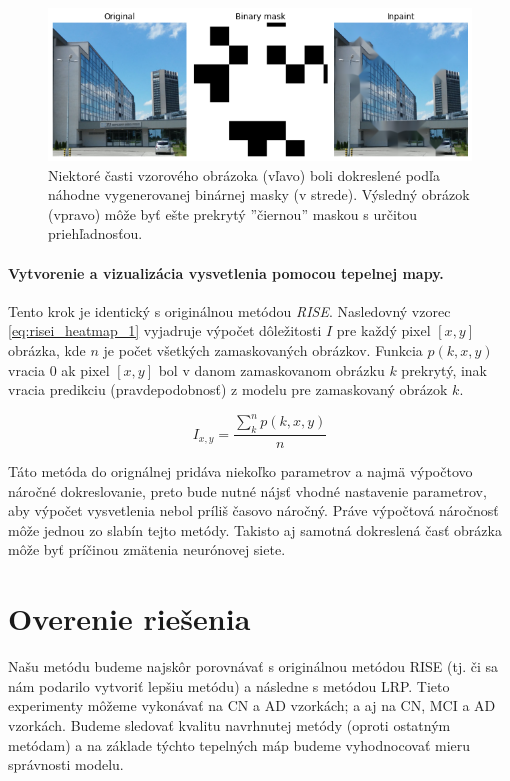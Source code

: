 \begin{figure}[h!]
    \centering
    \includegraphics[width=13cm]{assets/images/risei_inpainting_example.png}
    \caption{Niektoré časti vzorového obrázoka (vľavo) boli dokreslené podľa náhodne vygenerovanej binárnej masky (v strede). Výsledný obrázok (vpravo) môže byť ešte prekrytý ''čiernou'' maskou s určitou priehľadnosťou.}
    \label{fig:risei_inpainting_example}
\end{figure}

\paragraph{Vytvorenie a vizualizácia vysvetlenia pomocou tepelnej mapy.}

Tento krok je identický s originálnou metódou \textit{RISE}. Nasledovný vzorec \ref{eq:risei_heatmap_1} vyjadruje výpočet dôležitosti $I$ pre každý pixel $[x, y]$ obrázka, kde $n$ je počet všetkých zamaskovaných obrázkov. Funkcia $p(k, x, y)$ vracia $0$ ak pixel $[x, y]$ bol v danom zamaskovanom obrázku $k$ prekrytý, inak vracia predikciu (pravdepodobnosť) z modelu pre zamaskovaný obrázok $k$.

\begin{equation}
    I_{x, y} = \frac{\sum_{k}^{n} p(k, x, y)}{n}
    \label{eq:risei_heatmap_1}
\end{equation}

Táto metóda do orignálnej pridáva niekoľko parametrov a najmä výpočtovo náročné dokreslovanie, preto bude nutné nájsť vhodné nastavenie parametrov, aby výpočet vysvetlenia nebol príliš časovo náročný. Práve výpočtová náročnosť môže jednou zo slabín tejto metódy. Takisto aj samotná dokreslená časť obrázka môže byť príčinou zmätenia neurónovej siete.

\section{Overenie riešenia}

Našu metódu budeme najskôr porovnávať s originálnou metódou RISE (tj. či sa nám podarilo vytvoriť lepšiu metódu) a následne s metódou LRP. Tieto experimenty môžeme vykonávať na CN a AD vzorkách; a aj na CN, MCI a AD vzorkách. Budeme sledovať kvalitu navrhnutej metódy (oproti ostatným metódam) a na základe týchto tepelných máp budeme vyhodnocovať mieru správnosti modelu.

